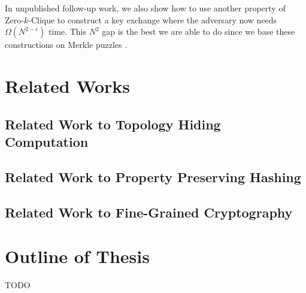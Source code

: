 In unpublished follow-up work, we also show how to use another property of Zero-$k$-Clique to construct a key exchange where the adversary now needs $\Omega(N^{2 - \epsilon})$ time. This $N^2$ gap is the best we are able to do since we base these constructions on Merkle puzzles \cite{optimalMerklePuzzles}.

\section{Related Works}
\subsection{Related Work to Topology Hiding Computation}

\subsection{Related Work to Property Preserving Hashing}

\subsection{Related Work to Fine-Grained Cryptography}

\section{Outline of Thesis}
TODO
